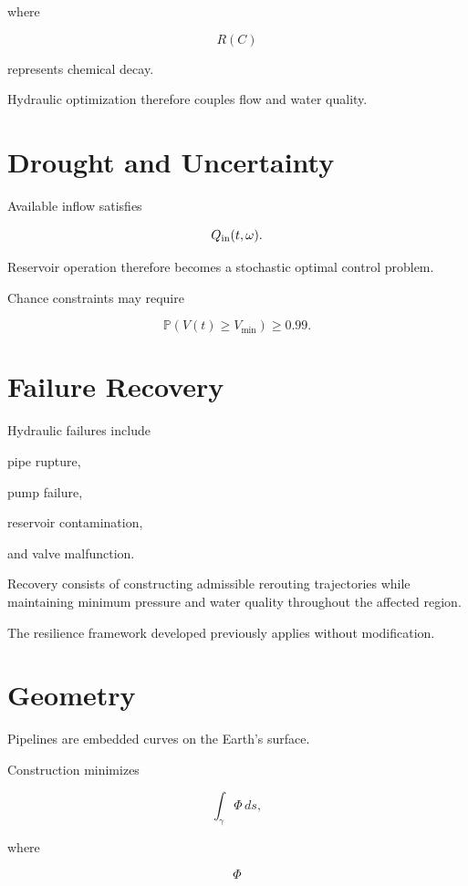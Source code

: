 \documentclass[11pt,fleqn]{book}
\numberwithin{equation}{chapter}
\theoremstyle{plain}
\theoremstyle{definition}
\theoremstyle{remark}
\begin{document}
where

\[
R(C)
\]

represents chemical decay.

Hydraulic optimization therefore couples flow and water quality.


\section{Drought and Uncertainty}

Available inflow satisfies

\[
Q_{\rm in}(t,\omega).
\]

Reservoir operation therefore becomes a stochastic optimal control
problem.

Chance constraints may require

\[
\mathbb P
(
V(t)\ge V_{\min}
)
\ge
0.99.
\]


\section{Failure Recovery}

Hydraulic failures include

pipe rupture,

pump failure,

reservoir contamination,

and valve malfunction.

Recovery consists of constructing admissible rerouting trajectories while
maintaining minimum pressure and water quality throughout the affected
region.

The resilience framework developed previously applies without
modification.


\section{Geometry}

Pipelines are embedded curves on the Earth's surface.

Construction minimizes

\[
\int_\gamma
\Phi
\,ds,
\]

where

\[
\Phi
\]
\end{document}
